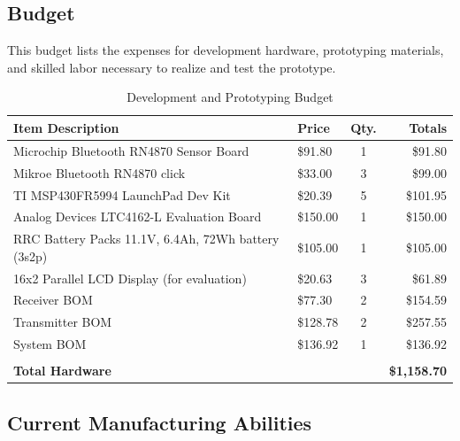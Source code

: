 \documentclass[12pt]{article}
\begin{document}
\hfill
\pagebreak
\hfill

\subsection{Budget}

\indent \indent
This budget lists the expenses for development hardware, prototyping materials, and skilled labor necessary to realize and test the prototype.

\hfill
\begin{table}[h!]
\centering
\caption{Development and Prototyping Budget}
\begin{tabular}{ | l | l | c | r | }
\hline
\textbf{Item Description} & \textbf{Price} & \textbf{Qty.}  & \textbf{Totals}\\
\hline
Microchip Bluetooth RN4870 Sensor Board & \$91.80 & 1 & \$91.80\\
\hline
Mikroe Bluetooth RN4870 click & \$33.00 & 3 & \$99.00\\
\hline
TI MSP430FR5994 LaunchPad Dev Kit & \$20.39 & 5 & \$101.95\\
\hline
Analog Devices LTC4162-L Evaluation Board & \$150.00 & 1 & \$150.00\\
\hline
RRC Battery Packs 11.1V, 6.4Ah, 72Wh battery (3s2p) & \$105.00 & 1 & \$105.00\\
\hline
16x2 Parallel LCD Display (for evaluation) & \$20.63 & 3 & \$61.89\\
\hline
Receiver BOM & \$77.30 & 2 & \$154.59\\
\hline
Transmitter BOM & \$128.78 & 2 & \$257.55\\
\hline
System BOM & \$136.92 & 1 & \$136.92\\
\hline
 &  &  & \\
\hline
\textbf{Total Hardware} &  &  & \textbf{\$1,158.70}\\
\hline
\end{tabular}
\end{table}

\hfill
\pagebreak
\hfill

\subsection{Current Manufacturing Abilities}
\end{document}
